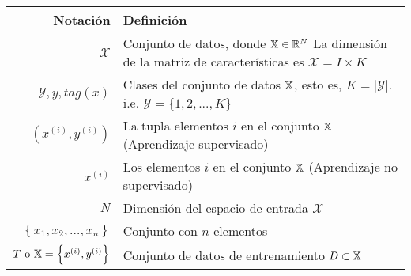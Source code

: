 \begin{table}[H]
    \begin{center}
        \begin{tabularx}{\textwidth}{|r|X|}
            \hline
            \textbf{Notación}                                                                     & \textbf{Definición}                                                                                                                                                     \\
            \hline %
            $ \mathcal{X} $                                                                       & Conjunto de datos, donde $\mathbb{{X}} \in \mathbb{R}^{N}$\newline{} La dimensión de la matriz de características es ${\mathcal{X} = I \times K}$                    \\
            $ \mathcal{Y}, y, tag(x) $                                                            & Clases del conjunto de datos $\mathbb{{X}}$, esto es, $\textit{K} = \lvert \mathcal{Y} \rvert$. \newline i.e. \scriptsize{${ \mathcal{Y} = \{1,2,...,\textit{K}\}}$} \\
            $ (x^{(i)},y^{(i)}) $                                                                 & La tupla elementos $i$ en el conjunto $\mathbb{{X}}$ (Aprendizaje supervisado)                                                                                       \\
            $ x^{(i)} $                                                                           & Los elementos $i$ en el conjunto $\mathbb{{X}}$ (Aprendizaje no supervisado)                                                                                         \\
            $ N $                                                                                 & Dimensión del espacio de entrada $\mathcal{X}$                                                                                                                          \\
            $ \left\{x_{1}, x_{2}, \ldots ,x_{n}\right\} $                                        & Conjunto con $n$ elementos                                                                                                                                              \\
            ${T~\text{o}~\mathbb{{X}}          = \left\{x^{(i)}, y^{(i)}\right\}}$             & Conjunto de datos de entrenamiento ${D \subset \mathbb{{X}}}$                                                                                                        \\

\end{tabularx}
\end{center}
\end{table}
